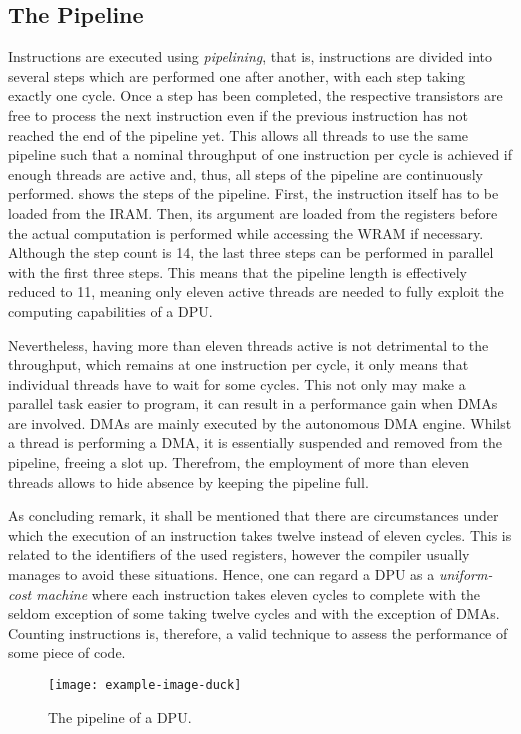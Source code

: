 \subsection{The Pipeline}
\label{sec:prereq:arch:pipeline}

Instructions are executed using \emph{pipelining}, that is, instructions are divided into several steps which are performed one after another, with each step taking exactly one cycle.
Once a step has been completed, the respective transistors are free to process the next instruction even if the previous instruction has not reached the end of the pipeline yet.
This allows all threads to use the same pipeline such that a nominal throughput of one instruction per cycle is achieved if enough threads are active and, thus, all steps of the pipeline are continuously performed.
 shows the steps of the pipeline.
First, the instruction itself has to be loaded from the \ac{IRAM}.
Then, its argument are loaded from the registers before the actual computation is performed while accessing the \ac{WRAM} if necessary.
Although the step count is 14, the last three steps can be performed in parallel with the first three steps.
This means that the pipeline length is effectively reduced to 11, meaning only eleven active threads are needed to fully exploit the computing capabilities of a DPU.

Nevertheless, having more than eleven threads active is not detrimental to the throughput, which remains at one instruction per cycle, it only means that individual threads have to wait for some cycles.
This not only may make a parallel task easier to program, it can result in a performance gain when \acp{DMA} are involved.
\Acp{DMA} are mainly executed by the autonomous \ac{DMA} engine.
Whilst a thread is performing a \ac{DMA}, it is essentially suspended and removed from the pipeline, freeing a slot up.
Therefrom, the employment of more than eleven threads allows to hide absence by keeping the pipeline full.

As concluding remark, it shall be mentioned that there are circumstances under which the execution of an instruction takes twelve instead of eleven cycles.
This is related to the identifiers of the used registers, however the compiler usually manages to avoid these situations.
Hence, one can regard a \ac{DPU} as a \emph{uniform-cost machine} where each instruction takes eleven cycles to complete with the seldom exception of some taking twelve cycles and with the exception of \acp{DMA}.
Counting instructions is, therefore, a valid technique to assess the performance of some piece of code.

\begin{figure}
	\centering
	\texttt{[image: example-image-duck]}

	\caption{
		The pipeline of a \ac{DPU}.
	}
	\label{fig:arch:pipeline}
\end{figure}
